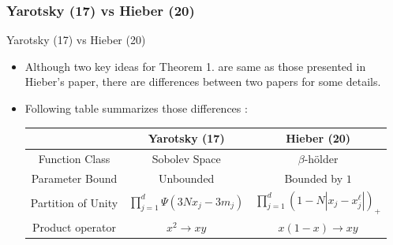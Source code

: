 \documentclass{if-beamer}
\begin{document}
\subsubsection{Yarotsky (17) vs Hieber (20)}
\begin{frame}{Yarotsky (17) vs Hieber (20)}
    \begin{itemize}
        \item Although two key ideas for Theorem 1. are same as those presented in Hieber's paper, there are differences between two papers for some details.
        \item Following table summarizes those differences : 
\begin{table}[]
\begin{tabular}{@{}c|c|c|@{}}
\toprule
                                 & Yarotsky (17)             & Hieber (20)               \\ \midrule
Function Class                  &  Sobolev Space            &   $\beta$-h\"older                    \\ \midrule
Parameter Bound                  &  Unbounded            &   Bounded by $1$                     \\ \midrule
Partition of Unity               &      $\prod_{j=1}^{d}\Psi(3Nx_{j}-3m_{j})$         &      $\prod_{j=1}^{d}(1-N|x_j-x_j^{\ell}|)_{+}$                 \\ \midrule
Product operator &  $x^{2}\rightarrow{xy}$  & $x(1-x)\rightarrow{xy}$ \\ \bottomrule
\end{tabular}
\end{table}

\end{itemize}
\end{frame}
\end{document}
